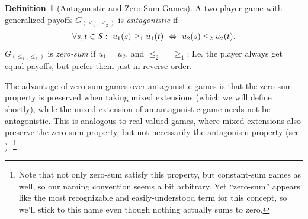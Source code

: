\documentclass[a4paper,DIV=11,abstracton,twoside=semi]{scrreprt}
\theoremstyle{definition}
\newtheorem{defn}[thm]{Definition} %
\begin{document}
    \begin{defn}[Antagonistic and Zero-Sum Games]
        A two-player game with generalized payoffs $G_{(\leq_1, \leq_2)}$ is \emph{antagonistic} if
        \begin{gather*}
            \forall s, t \in S:~ u_1(s) \geq_1 u_1(t) ~\Leftrightarrow~ u_2(s) \leq_2 u_2(t).
        \end{gather*}
        $G_{(\leq_1, \leq_2)}$ is \emph{zero-sum} if $u_1 = u_2$, and $\leq_2 {=} \geq_1$: I.e. the player always get equal payoffs, but prefer them just in reverse order.
        \label{def:zeroSumGeneralizedPayoffs}
    \end{defn}
    
    The advantage of zero-sum games over antagonistic games is that the zero-sum property is preserved when taking mixed extensions (which we will define shortly), while the mixed extension of an antagonistic game needs not be antagonistic. 
    This is analogous to real-valued games, where mixed extensions also preserve the zero-sum property, but not necessarily the antagonism property (see \cite{bib:andersonAntagonisticGames}).
    \footnote{Note that not only zero-sum satisfy this property, but constant-sum games as well, so our naming convention seems a bit arbitrary.
        Yet “zero-sum” appears like the most recognizable and easily-understood term for this concept, so we'll stick to this name even though nothing actually sums to zero.}
    
\end{document}
